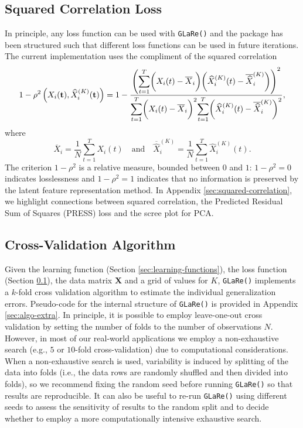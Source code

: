 \subsection{Squared Correlation Loss}\label{sec:loss-functions}

In principle, any loss function can be used with \texttt{GLaRe()} and the package has been structured such that different loss functions can be used in future iterations.
The current implementation uses the compliment of the squared correlation
$$
1- \rho^2 \left(X_i (\mathbf{t}), \widehat{X}^{(K)}_{i} (\mathbf{t}) \right) =
1 - \frac{\left( \mathlarger{\sum}_{t = 1}^T{\bigg(X_i (t) - \overline{X}_i \bigg) \bigg( \widehat{X}_i^{(K)} (t) - \overline{\widehat{X}}_i^{(K)} \bigg)} \right)^2}{\mathlarger{\sum}_{t = 1}^T \bigg(X_i (t) - \overline{X}_i \bigg)^2 \mathlarger{\sum}_{t = 1}^T \bigg( \widehat{X}_i^{(K)} (t) - \overline{\widehat{X}}_i^{(K)} \bigg) ^2},
$$
where
$$
\overline{X}_i = \frac{1}{N} \sum_{t=1}^T X_i (t) \quad \text{and} \quad \overline{\widehat{X}}_i^{(K)} = \frac{1}{N} \sum_{t=1}^T \widehat{X}_i^{(K)} (t).
$$
The criterion $1- \rho^2$ is a relative measure, bounded between $0$ and $1$: $1- \rho^2 = 0$ indicates losslessness and $1- \rho^2 = 1$ indicates that no information is preserved by the latent feature representation method.
In Appendix \ref{sec:squared-correlation}, we highlight connections between squared correlation, the Predicted Residual Sum of Squares (PRESS) loss and the scree plot for PCA.

\subsection{Cross-Validation Algorithm}

Given the learning function (Section \ref{sec:learning-functions}), the loss function (Section \ref{sec:loss-functions}), the data matrix $\mathbf{X}$ and a grid of values for $K$, \texttt{GLaRe()} implements a $k$-fold cross validation algorithm to estimate the individual generalization errors.
Pseudo-code for the internal structure of \texttt{GLaRe()} is provided in Appendix \ref{sec:algo-extra}.
In principle, it is possible to employ leave-one-out cross validation by setting the number of folds to the number of observations $N$.
However, in most of our real-world applications we employ a non-exhaustive search (e.g., $5$ or $10$-fold cross-validation) due to computational considerations.
When a non-exhaustive search is used, variability is induced by splitting of the data into folds (i.e., the data rows are randomly shuffled and then divided into folds), so we recommend fixing the random seed before running \texttt{GLaRe()} so that results are reproducible.
It can also be useful to re-run \texttt{GLaRe()} using different seeds to assess the sensitivity of results to the random split and to decide whether to employ a more computationally intensive exhaustive search.


